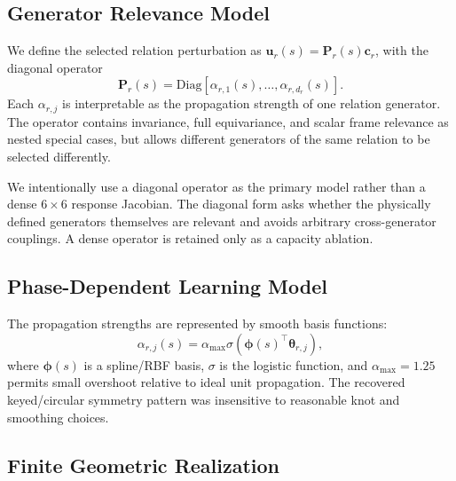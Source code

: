 \documentclass[letterpaper,10pt,conference]{ieeeconf}
\begin{document}
\subsection{Generator Relevance Model}
\label{sec:generator_relevance}

We define the selected relation perturbation as
$\bm u_r(s)=\mathbf P_r(s)\bm c_r$, with the diagonal operator
\begin{equation}
    \boxed{
    \mathbf P_r(s)=
    \mathrm{Diag}\!\left[
    \alpha_{r,1}(s),\ldots,\alpha_{r,d_r}(s)
    \right].
    }
    \label{eq:pdiag}
\end{equation}
Each $\alpha_{r,j}$ is interpretable as the propagation strength of one
relation generator. The operator contains invariance, full equivariance, and
scalar frame relevance as nested special cases, but allows different generators
of the same relation to be selected differently.

We intentionally use a diagonal operator as the primary model rather than a
dense $6\times6$ response Jacobian. The diagonal form asks whether the
physically defined generators themselves are relevant and avoids arbitrary
cross-generator couplings. A dense operator is retained only as a capacity
ablation.

\subsection{Phase-Dependent Learning Model}

The propagation strengths are represented by smooth basis functions:
\begin{equation}
    \alpha_{r,j}(s)
    =
    \alpha_{\max}
    \sigma\!\left(
    \bm\phi(s)^\top\bm\theta_{r,j}
    \right),
    \label{eq:basis}
\end{equation}
where $\bm\phi(s)$ is a spline/RBF basis, $\sigma$ is the logistic function,
and $\alpha_{\max}=1.25$ permits small overshoot relative to ideal unit
propagation. The recovered keyed/circular symmetry pattern was insensitive to
reasonable knot and smoothing choices.

\subsection{Finite Geometric Realization}
\end{document}
